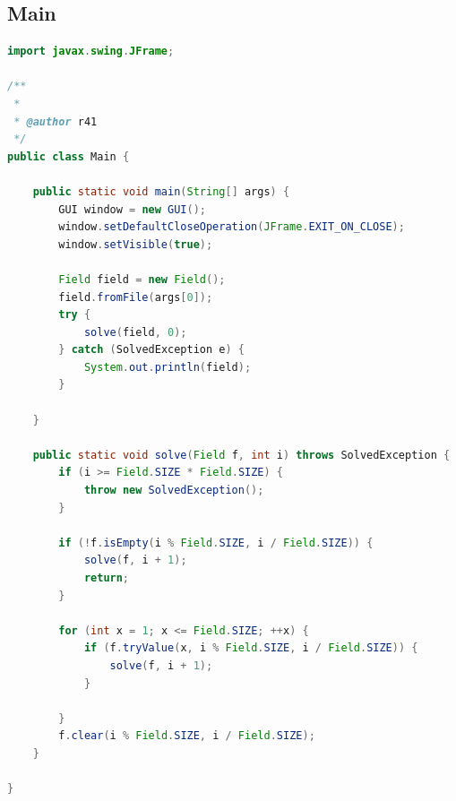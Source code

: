 \documentclass[a4paper,10pt]{article}
\begin{document}
\subsection{Main}
\begin{lstlisting}[language=java]
import javax.swing.JFrame;

/**
 *
 * @author r41
 */
public class Main {

    public static void main(String[] args) {
        GUI window = new GUI();
        window.setDefaultCloseOperation(JFrame.EXIT_ON_CLOSE);
        window.setVisible(true);

        Field field = new Field();
        field.fromFile(args[0]);
        try {
            solve(field, 0);
        } catch (SolvedException e) {
            System.out.println(field);
        }

    }

    public static void solve(Field f, int i) throws SolvedException {
        if (i >= Field.SIZE * Field.SIZE) {
            throw new SolvedException();
        }

        if (!f.isEmpty(i % Field.SIZE, i / Field.SIZE)) {
            solve(f, i + 1);
            return;
        }

        for (int x = 1; x <= Field.SIZE; ++x) {
            if (f.tryValue(x, i % Field.SIZE, i / Field.SIZE)) {
                solve(f, i + 1);
            }

        }
        f.clear(i % Field.SIZE, i / Field.SIZE);
    }

}
\end{lstlisting}
\newpage
\end{document}
